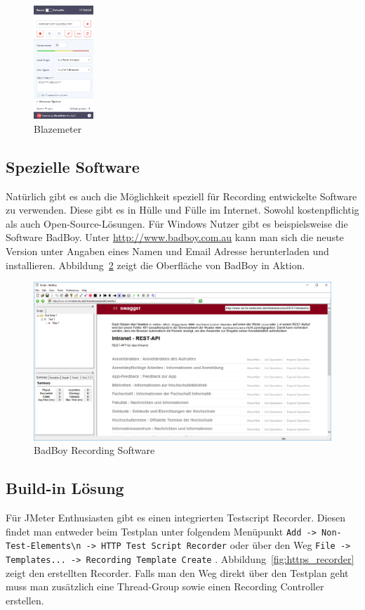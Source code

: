 \documentclass[a4paper,12pt]{article}
\newcommand{\codeInLine}[1]{%
\colorbox{graybackgroundColor}{\lstinline{#1}} %
}
\begin{document}
\begin{figure}[htb]%
 \centering
    \includegraphics[width=0.2\textwidth]{bilder/blazemeter.png}
  \caption{Blazemeter}
  \label{fig:blazemeter}
\end{figure}

\subsection{Spezielle Software}
Natürlich gibt es auch die Möglichkeit speziell für Recording entwickelte Software zu verwenden. Diese gibt es in Hülle und Fülle im Internet. Sowohl kostenpflichtig als auch Open-Source-Lösungen. Für Windows Nutzer gibt es beispielsweise die Software BadBoy. Unter \url{http://www.badboy.com.au} kann man sich die neuste Version unter Angaben eines Namen und Email Adresse herunterladen und installieren. Abbildung~\ref{fig:badboy} zeigt die Oberfläche von BadBoy in Aktion. 

\begin{figure}[htb]%
 \centering
    \includegraphics[width=1\textwidth]{bilder/badboy.png}
  \caption{BadBoy Recording Software}
  \label{fig:badboy}
\end{figure}

\subsection{Build-in Lösung}
Für JMeter Enthusiasten gibt es einen integrierten Testscript Recorder. Diesen findet man entweder beim Testplan unter folgendem Menüpunkt \codeInLine{Add -> Non-Test-Elements\n -> HTTP Test Script Recorder} oder über den Weg \codeInLine{File -> Templates... -> Recording Template Create}.
Abbildung~\ref{fig:https_recorder} zeigt den erstellten Recorder. Falls man den Weg direkt über den Testplan geht muss man zusätzlich eine Thread-Group sowie einen Recording Controller erstellen.
\end{document}
